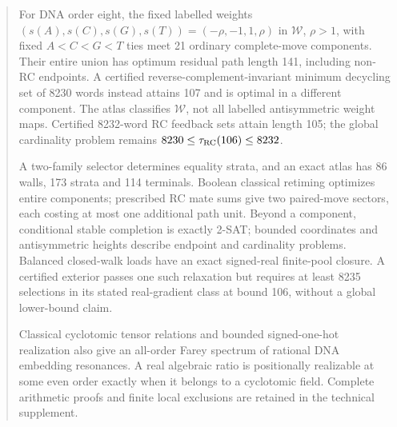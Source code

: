 \begin{abstract}
For DNA order eight, the fixed labelled weights $(s(A),s(C),s(G),s(T))=(-\rho,-1,1,\rho)$ in $\mathcal W$, $\rho>1$, with fixed $A<C<G<T$ ties meet 21 ordinary complete-move components. Their entire union has optimum residual path length 141, including non-RC endpoints. A certified reverse-complement-invariant minimum decycling set of 8230 words instead attains 107 and is optimal in a different component. The atlas classifies $\mathcal W$, not all labelled antisymmetric weight maps. Certified 8232-word RC feedback sets attain length 105; the global cardinality problem remains $8230\le\tau_{\RC}(106)\le8232$.

A two-family selector determines equality strata, and an exact atlas has 86 walls, 173 strata and 114 terminals. Boolean classical retiming optimizes entire components; prescribed RC mate sums give two paired-move sectors, each costing at most one additional path unit. Beyond a component, conditional stable completion is exactly 2-SAT; bounded coordinates and antisymmetric heights describe endpoint and cardinality problems. Balanced closed-walk loads have an exact signed-real finite-pool closure. A certified exterior passes one such relaxation but requires at least 8235 selections in its stated real-gradient class at bound 106, without a global lower-bound claim.

Classical cyclotomic tensor relations and bounded signed-one-hot realization also give an all-order Farey spectrum of rational DNA embedding resonances. A real algebraic ratio is positionally realizable at some even order exactly when it belongs to a cyclotomic field. Complete arithmetic proofs and finite local exclusions are retained in the technical supplement.
\end{abstract}
